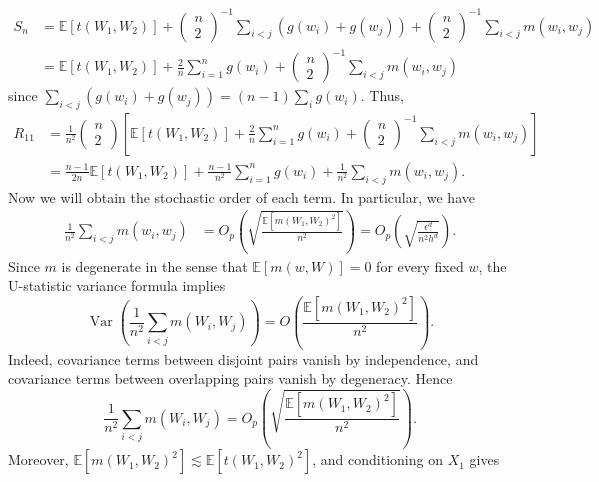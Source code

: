 \documentclass[11pt]{article}
\begin{document}
\begin{align*}
    S_n &=  \mathbb{E}[t(W_1, W_2)] + \begin{pmatrix}
        n \\
        2
    \end{pmatrix}^{-1}\sum_{i < j} (g(w_i) + g(w_j)) + \begin{pmatrix}
        n \\
        2
    \end{pmatrix}^{-1}\sum_{i < j}m(w_i, w_j) \\
    &= \mathbb{E}[t(W_1, W_2)] + \frac{2}{n}\sum_{i = 1}^n g(w_i) + \begin{pmatrix}
        n \\
        2
    \end{pmatrix}^{-1}\sum_{i < j}m(w_i, w_j)
\end{align*}
since $\sum_{i < j} (g(w_i) + g(w_j)) = (n-1)\sum_{i}g(w_i)$. Thus,
\begin{align*}
    R_{11} &= \frac{1}{n^2}\begin{pmatrix}
        n \\
        2
    \end{pmatrix}\left[\mathbb{E}[t(W_1, W_2)] + \frac{2}{n}\sum_{i = 1}^n g(w_i) + \begin{pmatrix}
        n \\
        2
    \end{pmatrix}^{-1}\sum_{i < j}m(w_i, w_j)\right] \\
    &= \frac{n-1}{2n}\mathbb{E}[t(W_1, W_2)] + \frac{n-1}{n^2}\sum_{i = 1}^n g(w_i) + \frac{1}{n^2}\sum_{i < j}m(w_i, w_j).
\end{align*}
Now we will obtain the stochastic order of each term. In particular, we have 
\begin{align*}
    \frac{1}{n^2}\sum_{i < j}m(w_i, w_j) &= O_p\left(\sqrt{\frac{\mathbb{E}[m(W_1, W_2)^2]}{n^2}}\right) = O_p\left(\sqrt{\frac{\epsilon^d}{n^2h^d}}\right). 
\end{align*}
Since $m$ is degenerate in the sense that $\mathbb{E}[m(w,W)] = 0$ for every fixed $w$, the U-statistic variance formula implies
\[
\operatorname{Var}\left(\frac{1}{n^2}\sum_{i<j}m(W_i,W_j)\right)
= O\left(\frac{\mathbb{E}[m(W_1,W_2)^2]}{n^2}\right).
\]
Indeed, covariance terms between disjoint pairs vanish by independence, and covariance terms between overlapping pairs vanish by degeneracy. Hence
\[
\frac{1}{n^2}\sum_{i<j}m(W_i,W_j)
= O_p\left(\sqrt{\frac{\mathbb{E}[m(W_1,W_2)^2]}{n^2}}\right).
\]
Moreover, $\mathbb{E}[m(W_1,W_2)^2] \lesssim \mathbb{E}[t(W_1,W_2)^2]$, and conditioning on $X_1$ gives
\end{document}
